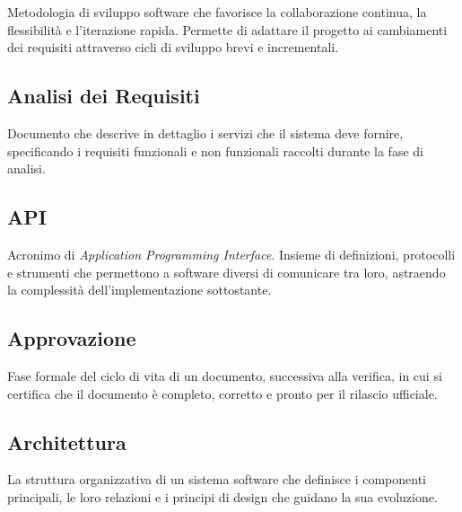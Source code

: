 \documentclass[a4paper, 11pt, oneside]{scrartcl} %
\begin{document}

Metodologia di sviluppo software che favorisce la collaborazione continua, la flessibilità e l'iterazione rapida. Permette di adattare il progetto ai cambiamenti dei requisiti attraverso cicli di sviluppo brevi e incrementali.

\vspace{0.5cm}

\subsection*{Analisi dei Requisiti}


Documento che descrive in dettaglio i servizi che il sistema deve fornire, specificando i requisiti funzionali e non funzionali raccolti durante la fase di analisi.

\vspace{0.5cm}

\subsection*{API}
Acronimo di \textit{Application Programming Interface}. Insieme di definizioni, protocolli e strumenti che permettono a software diversi di comunicare tra loro, astraendo la complessità dell'implementazione sottostante.
\vspace{0.5cm}

\subsection*{Approvazione}


Fase formale del ciclo di vita di un documento, successiva alla verifica, in cui si certifica che il documento è completo, corretto e pronto per il rilascio ufficiale.

\vspace{0.5cm}

\subsection*{Architettura}


La struttura organizzativa di un sistema software che definisce i componenti principali, le loro relazioni e i principi di design che guidano la sua evoluzione.
\end{document}
